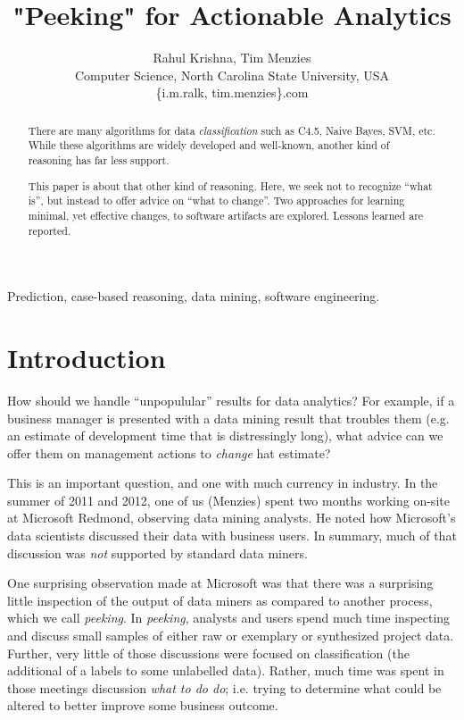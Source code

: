 \documentclass[conference]{IEEEtran}
\title{"Peeking" for Actionable Analytics}
\author{Rahul Krishna, Tim Menzies\\
        Computer Science, North Carolina State University, USA\\
       \{i.m.ralk, tim.menzies\}\@gmail.com
       
}
\begin{document}
  \maketitle
    \begin{abstract}
There are many
    algorithms for data {\em classification} such as  C4.5, Naive Bayes, SVM, etc. While these algorithms are widely developed and well-known, another kind
    of reasoning has far less support.
    
This paper is about that other kind of reasoning. Here, we seek not
    to recognize ``what is'', but instead to offer advice on ``what to change''.
Two approaches for learning minimal, yet effective changes, to software
artifacts are explored. Lessons learned are reported.
  \end{abstract}
  \begin{IEEEkeywords}
Prediction, case-based reasoning, data mining, software engineering.
  \end{IEEEkeywords}

\section{Introduction} 
How should we handle ``unpopulular'' results
    for data analytics? For example, if a business manager is presented
    with a data mining result that troubles them (e.g. an estimate of
    development time that is distressingly long), what advice
    can we offer them on management actions to {\em change} hat estimate?
    
This is an important question, and one with much currency in industry. 
In the summer of 2011 and 2012, one of us (Menzies) spent two months
working on-site at Microsoft Redmond, 
observing data mining analysts.  He
noted how Microsoft's data scientists
discussed their data with  business users. In summary, much
of that discussion was {\em not} supported by standard data miners.

One surprising observation made at Microsoft  was that
there was a surprising little
inspection of the output of data miners as compared to another process, which we call {\em peeking}.
In {\em peeking}, analysts and users spend much time 
inspecting and discuss small samples of either raw or exemplary or synthesized project data.  Further, very little of those discussions were  focused on classification
(the additional of a labels to some unlabelled data). Rather, much time
was spent in those meetings discussion {\em what to do do}; i.e. trying
to determine what could be altered to better improve some business outcome.
\end{document}
